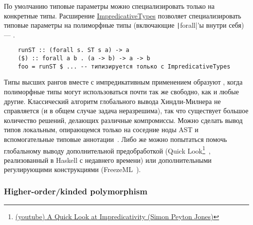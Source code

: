 По умолчанию типовые параметры можно специализировать только на конкретные типы.
Расширение \href{https://downloads.haskell.org/ghc/latest/docs/users_guide/exts/impredicative_types.html}{ImpredicativeTypes} позволяет специализировать типовые параметры на полиморфные типы (включающие \texttt|forall|'ы внутри себя) --- .
\begin{verbatim}
    runST :: (forall s. ST s a) -> a
    ($) :: forall a b . (a -> b) -> a -> b
    foo = runST $ ... -- типизируется только с ImpredicativeTypes
\end{verbatim}

Типы высших рангов вместе с импредикативным применением образуют , когда полиморфные типы могут использоваться почти так же свободно, как и любые другие.
Классический алгоритм глобального вывода Хиндли-Милнера не справляется (и в общем случае задача неразрешима), так что существует большое количество решений, делающих различные компромиссы.
Можно сделать вывод типов локальным, опирающемся только на соседние ноды AST и вспомогательные типовые аннотации~\cite{pierce2000local, christiansen2013bidirectional, dunfield2019sound}.
Либо же можно попытаться помочь глобальному выводу дополнительной предобработкой (Quick Look\footnote{\href{https://youtu.be/ZuNMo136QqI?si=qp8PAEeeF-bioCB_}{(youtube) A Quick Look at Impredicativity (Simon Peyton Jones)}}~\cite{serrano2020quick}, реализованный в Haskell с недавнего времени) или дополнительными регулирующими конструкциями (FreezeML~\cite{emrich2020freezeml}).

\subsubsection{Higher-order/kinded polymorphism}



